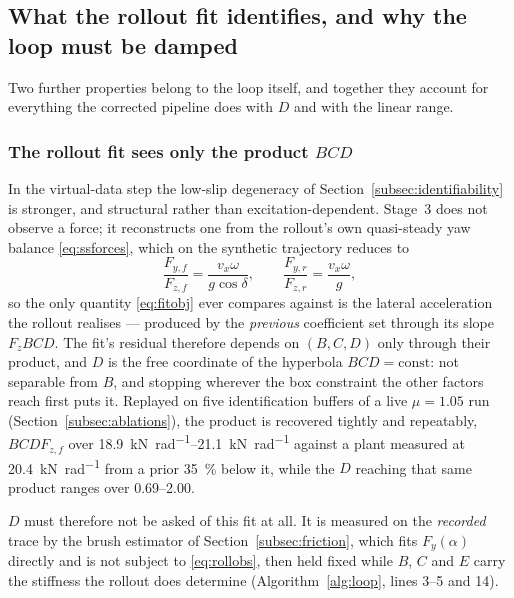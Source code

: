 \subsection{What the rollout fit identifies, and why the loop must be damped}
\label{subsec:contraction}

Two further properties belong to the loop itself, and together they account for
everything the corrected pipeline does with $D$ and with the linear range.

\subsubsection{The rollout fit sees only the product $BCD$}
\label{subsec:bcd}
In the virtual-data step the low-slip degeneracy of
Section~\ref{subsec:identifiability} is stronger, and structural rather than
excitation-dependent. Stage~3 does not observe a force; it reconstructs one
from the rollout's own quasi-steady yaw balance \eqref{eq:ssforces}, which on
the synthetic trajectory reduces to
\begin{equation}
\frac{F_{y,f}}{F_{z,f}}=\frac{v_{x}\omega}{g\cos\delta},\qquad
\frac{F_{y,r}}{F_{z,r}}=\frac{v_{x}\omega}{g},
\label{eq:rollobs}
\end{equation}
so the only quantity \eqref{eq:fitobj} ever compares against is the lateral
acceleration the rollout realises --- produced by the \emph{previous}
coefficient set through its slope $F_{z}BCD$. The fit's residual therefore
depends on $(B,C,D)$ only through their product, and $D$ is the free coordinate
of the hyperbola $BCD=\mathrm{const}$: not separable from $B$, and stopping
wherever the box constraint the other factors reach first puts it. Replayed on
five identification buffers of a live $\mu=\num{1.05}$ run
(Section~\ref{subsec:ablations}), the product is recovered tightly and
repeatably, $BCDF_{z,f}$ over \SIrange{18.9}{21.1}{\kilo\newton\per\radian}
against a plant measured at \SI{20.4}{\kilo\newton\per\radian} from a prior
\SI{35}{\percent} below it, while the $D$ reaching that same product ranges
over \numrange{0.69}{2.00}.

$D$ must therefore not be asked of this fit at all. It is measured on the
\emph{recorded} trace by the brush estimator of
Section~\ref{subsec:friction}, which fits $F_{y}(\alpha)$ directly and is not
subject to \eqref{eq:rollobs}, then held fixed while $B$, $C$ and $E$ carry the
stiffness the rollout does determine (Algorithm~\ref{alg:loop}, lines 3--5
and 14).

